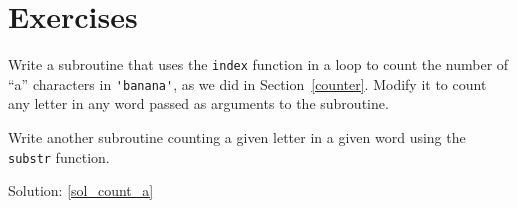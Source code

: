 \section{Exercises}


\begin{exercise}
\label{count_a}

Write a subroutine that uses the {\tt index} function in a 
loop to count the number of ``a'' characters in \verb"'banana'",
as we did in Section~\ref{counter}. Modify it to count 
any letter in any word passed as arguments to the subroutine.

Write another subroutine counting a given letter in a given 
word using the {\tt substr} function.

Solution: \ref{sol_count_a}
\end{exercise}


